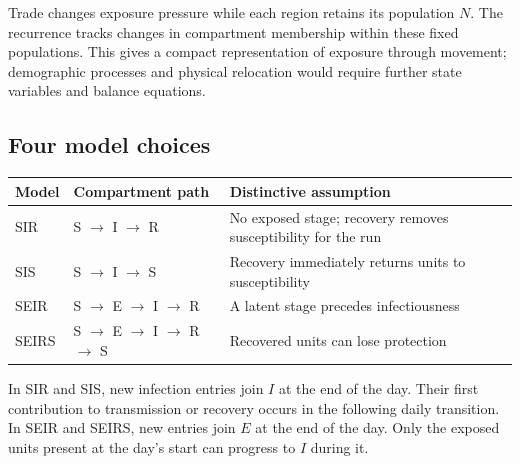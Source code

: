 \documentclass[11pt,a4paper]{article}
\begin{document}
Trade changes exposure pressure while each region retains its population
\(N\). The recurrence tracks changes in compartment membership within
these fixed populations. This gives a compact representation of exposure
through movement; demographic processes and physical relocation would
require further state variables and balance equations.

\subsection{Four model choices}\label{four-model-choices}

\begin{longtable}[]{@{}
  >{\raggedright\arraybackslash}p{}
  >{\raggedright\arraybackslash}p{}
  >{\raggedright\arraybackslash}p{}@{}}
\toprule\noalign{}
\begin{minipage}[b]{\linewidth}\raggedright
Model
\end{minipage} & \begin{minipage}[b]{\linewidth}\raggedright
Compartment path
\end{minipage} & \begin{minipage}[b]{\linewidth}\raggedright
Distinctive assumption
\end{minipage} \\
\midrule\noalign{}
\endhead
\bottomrule\noalign{}
\endlastfoot
SIR & S \ensuremath{\rightarrow} I \ensuremath{\rightarrow} R & No exposed stage; recovery removes susceptibility for
the run \\
SIS & S \ensuremath{\rightarrow} I \ensuremath{\rightarrow} S & Recovery immediately returns units to
susceptibility \\
SEIR & S \ensuremath{\rightarrow} E \ensuremath{\rightarrow} I \ensuremath{\rightarrow} R & A latent stage precedes infectiousness \\
SEIRS & S \ensuremath{\rightarrow} E \ensuremath{\rightarrow} I \ensuremath{\rightarrow} R \ensuremath{\rightarrow} S & Recovered units can lose protection \\
\end{longtable}

In SIR and SIS, new infection entries join \(I\) at the end of the day.
Their first contribution to transmission or recovery occurs in the
following daily transition. In SEIR and SEIRS, new entries join \(E\) at
the end of the day. Only the exposed units present at the day's start
can progress to \(I\) during it.
\end{document}
